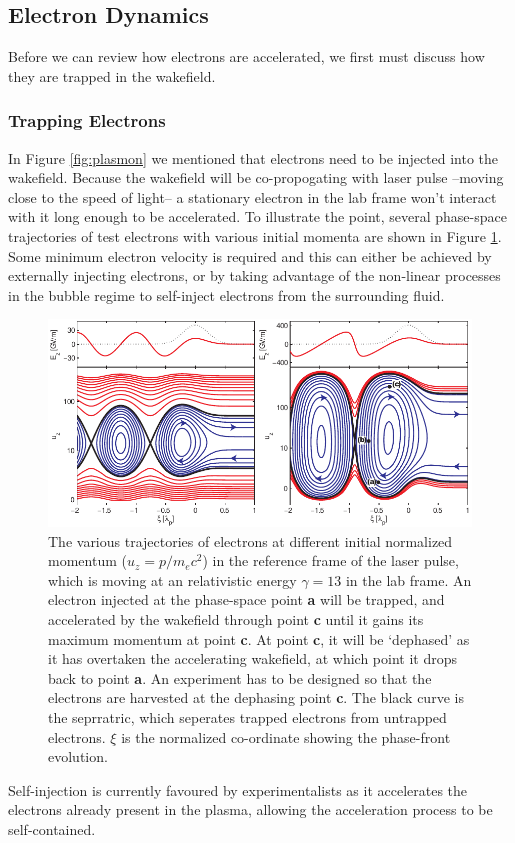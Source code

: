 \documentclass[12pt,letter]{article}
\begin{document}
   \subsection{Electron Dynamics}
   Before we can review how electrons are
    accelerated, we first must discuss how they are trapped in the wakefield.    \subsubsection{Trapping Electrons}
    In Figure \ref{fig:plasmon} we mentioned that electrons need
    to be injected into the wakefield. Because the wakefield will be
    co-propogating with laser pulse --moving close to the speed of light-- a
    stationary electron in the lab frame won't interact with it long enough to
    be accelerated.
    To illustrate the point, several phase-space trajectories of test electrons
    with various initial momenta are shown in Figure
    \ref{fig:trapping}. Some minimum electron velocity is required and this can
    either be achieved by externally injecting electrons, or by taking
    advantage of the non-linear processes in the bubble regime to self-inject
    electrons from the surrounding fluid.
\begin{figure}[h!]%
    \includegraphics[width=\textwidth]{../figures/trapping.pdf}
    \caption{\label{fig:trapping} The various trajectories of electrons at
    different initial normalized momentum ($u_z= p/m_e c^2$) in the reference frame of the laser
pulse, which is moving at an relativistic energy $\gamma = 13$ in the lab frame.
An electron injected at the phase-space point \textbf{a} will be trapped, and
accelerated by the wakefield through point \textbf{c} until it gains its maximum
momentum at point \textbf{c}. At point \textbf{c}, it will be `dephased' as it has overtaken
the accelerating wakefield, at which point it drops back to point \textbf{a}. An
experiment has to be designed so that the electrons are harvested at the
dephasing point \textbf{c}. The black curve is the seprratric, which seperates
trapped electrons from untrapped electrons. $\xi$ is the normalized
co-ordinate showing the phase-front evolution\cite{genothesis}.}

\end{figure}
    Self-injection is currently favoured by experimentalists as it accelerates the
    electrons already present in the plasma, allowing the acceleration process to be self-contained.
    
\end{document}
